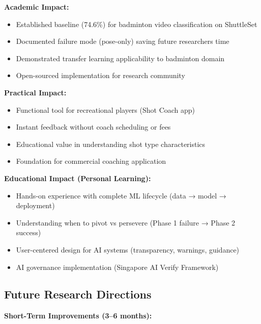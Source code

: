 \documentclass[11pt,a4paper]{article}
\begin{document}
\textbf{Academic Impact:}

\begin{itemize}
\item Established baseline (74.6\%) for badminton video classification on ShuttleSet
\item Documented failure mode (pose-only) saving future researchers time
\item Demonstrated transfer learning applicability to badminton domain
\item Open-sourced implementation for research community
\end{itemize}

\textbf{Practical Impact:}

\begin{itemize}
\item Functional tool for recreational players (Shot Coach app)
\item Instant feedback without coach scheduling or fees
\item Educational value in understanding shot type characteristics
\item Foundation for commercial coaching application
\end{itemize}

\textbf{Educational Impact (Personal Learning):}

\begin{itemize}
\item Hands-on experience with complete ML lifecycle (data → model → deployment)
\item Understanding when to pivot vs persevere (Phase 1 failure → Phase 2 success)
\item User-centered design for AI systems (transparency, warnings, guidance)
\item AI governance implementation (Singapore AI Verify Framework)
\end{itemize}

\subsection{Future Research Directions}

\textbf{Short-Term Improvements (3--6 months):}
\end{document}
